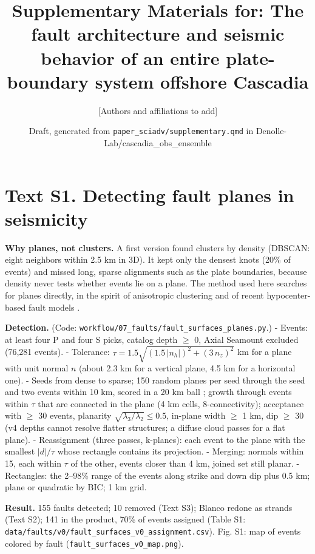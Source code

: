 \documentclass[11pt]{article}
\title{Supplementary Materials for: The fault architecture and seismic behavior of an entire plate-boundary system offshore Cascadia}
\author{[Authors and affiliations to add]}
\date{Draft, generated from \texttt{paper\_sciadv/supplementary.qmd} in Denolle-Lab/cascadia\_obs\_ensemble}
\begin{document}
\maketitle
\section{Text S1. Detecting fault planes in
seismicity}\label{text-s1.-detecting-fault-planes-in-seismicity}

\textbf{Why planes, not clusters.} A first version found clusters by
density (DBSCAN: eight neighbors within 2.5 km in 3D). It kept only the
densest knots (20\% of events) and missed long, sparse alignments such
as the plate boundaries, because density never tests whether events lie
on a plane. The method used here searches for planes directly, in the
spirit of anisotropic clustering \citep{Ouillon2008, Wang2013} and of
recent hypocenter-based fault models \citep{Alongi2025}.

\textbf{Detection.} (Code:
\texttt{workflow/07\_faults/fault\_surfaces\_planes.py}.) - Events: at
least four P and four S picks, catalog depth \ensuremath{\geq} 0, Axial Seamount
excluded (76,281 events). - Tolerance:
\(\tau = 1.5\sqrt{(1.5\,|n_h|)^2 + (3\,n_z)^2}\) km for a plane with
unit normal \(n\) (about 2.3 km for a vertical plane, 4.5 km for a
horizontal one). - Seeds from dense to sparse; 150 random planes per
seed through the seed and two events within 10 km, scored in a 20 km
ball \citep{Fischler1981}; growth through events within \(\tau\) that
are connected in the plane (4 km cells, 8-connectivity); acceptance with
\ensuremath{\geq} 30 events, planarity \(\sqrt{\lambda_3/\lambda_2} \le
  0.5\), in-plane width \ensuremath{\geq} 1 km, dip \ensuremath{\geq} 30\textdegree{} (v4 depths cannot resolve
flatter structures; a diffuse cloud passes for a flat plane). -
Reassignment (three passes, k-planes): each event to the plane with the
smallest \(|d|/\tau\) whose rectangle contains its projection. -
Merging: normals within 15\textdegree{}, each within \(\tau\) of the other, events
closer than 4 km, joined set still planar. - Rectangles: the 2--98\%
range of the events along strike and down dip plus 0.5 km; plane or
quadratic by BIC; 1 km grid.

\textbf{Result.} 155 faults detected; 10 removed (Text S3); Blanco
redone as strands (Text S2); 141 in the product, 70\% of events assigned
(Table S1: \texttt{data/faults/v0/fault\_surfaces\_v0\_assignment.csv}).
Fig. S1: map of events colored by fault
(\texttt{fault\_surfaces\_v0\_map.png}).
\end{document}
